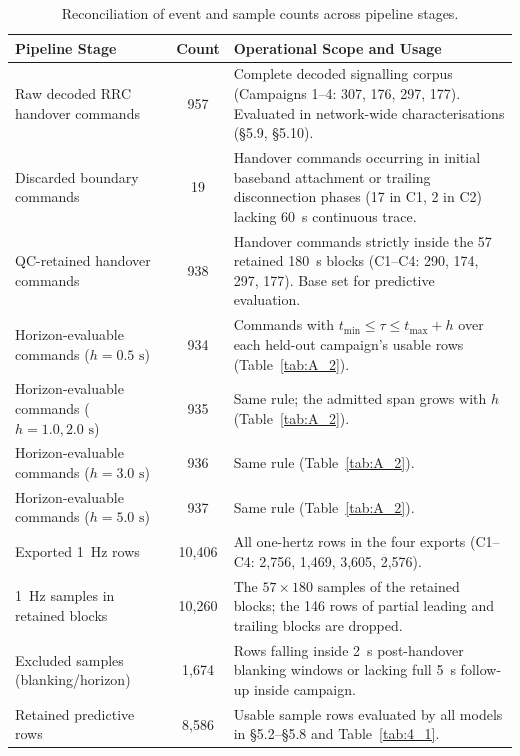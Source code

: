 \begin{table}[htbp]
\centering
\caption{Reconciliation of event and sample counts across pipeline stages.}
\label{tab:3_reconciliation}
\vspace{0.4em}
\singlespacing
\small
\begin{tabularx}{\linewidth}{l c X}
\toprule
\textbf{Pipeline Stage} & \textbf{Count} & \textbf{Operational Scope and Usage} \\
\midrule
Raw decoded RRC handover commands & 957 & Complete decoded signalling corpus (Campaigns 1--4: 307, 176, 297, 177). Evaluated in network-wide characterisations (\S5.9, \S5.10). \\
Discarded boundary commands & 19 & Handover commands occurring in initial baseband attachment or trailing disconnection phases (17 in C1, 2 in C2) lacking 60~s continuous trace. \\
QC-retained handover commands & 938 & Handover commands strictly inside the 57 retained 180~s blocks (C1--C4: 290, 174, 297, 177). Base set for predictive evaluation. \\
Horizon-evaluable commands ($h = 0.5\text{ s}$) & 934 & Commands with $t_{\min} \le \tau \le t_{\max} + h$ over each held-out campaign's usable rows (Table~\ref{tab:A_2}). \\
Horizon-evaluable commands ($h = 1.0, 2.0\text{ s}$) & 935 & Same rule; the admitted span grows with $h$ (Table~\ref{tab:A_2}). \\
Horizon-evaluable commands ($h = 3.0\text{ s}$) & 936 & Same rule (Table~\ref{tab:A_2}). \\
Horizon-evaluable commands ($h = 5.0\text{ s}$) & 937 & Same rule (Table~\ref{tab:A_2}). \\
\midrule
Exported 1~Hz rows & 10,406 & All one-hertz rows in the four exports (C1--C4: 2,756, 1,469, 3,605, 2,576). \\
1~Hz samples in retained blocks & 10,260 & The $57 \times 180$ samples of the retained blocks; the 146 rows of partial leading and trailing blocks are dropped. \\
Excluded samples (blanking/horizon) & 1,674 & Rows falling inside 2~s post-handover blanking windows or lacking full 5~s follow-up inside campaign. \\
Retained predictive rows & 8,586 & Usable sample rows evaluated by all models in \S5.2--\S5.8 and Table~\ref{tab:4_1}. \\
\bottomrule
\end{tabularx}
\end{table}


